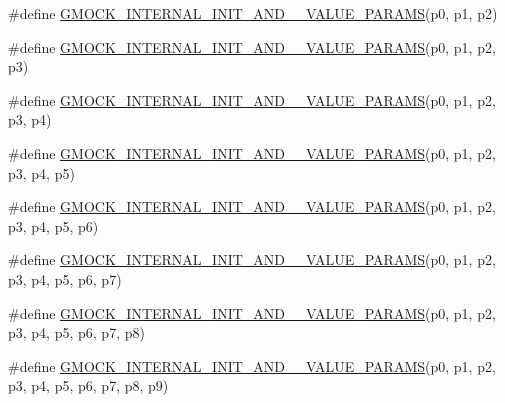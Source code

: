 \begin{DoxyCompactItemize}
\item 
\#define \mbox{\hyperlink{googletest-master_2googlemock_2include_2gmock_2gmock-generated-actions_8h_ab452cc97981b64f68df83aedc023a201}{G\+M\+O\+C\+K\+\_\+\+I\+N\+T\+E\+R\+N\+A\+L\+\_\+\+I\+N\+I\+T\+\_\+\+A\+N\+D\+\_\+\_\+\+V\+A\+L\+U\+E\+\_\+\+P\+A\+R\+A\+MS}}(p0,  p1,  p2)
\item 
\#define \mbox{\hyperlink{googletest-master_2googlemock_2include_2gmock_2gmock-generated-actions_8h_a9749c8366b3617ee3d14f4f4e9ae18ae}{G\+M\+O\+C\+K\+\_\+\+I\+N\+T\+E\+R\+N\+A\+L\+\_\+\+I\+N\+I\+T\+\_\+\+A\+N\+D\+\_\+\_\+\+V\+A\+L\+U\+E\+\_\+\+P\+A\+R\+A\+MS}}(p0,  p1,  p2,  p3)
\item 
\#define \mbox{\hyperlink{googletest-master_2googlemock_2include_2gmock_2gmock-generated-actions_8h_ab3c77cabbb94ae2e3a4f9fdbda784731}{G\+M\+O\+C\+K\+\_\+\+I\+N\+T\+E\+R\+N\+A\+L\+\_\+\+I\+N\+I\+T\+\_\+\+A\+N\+D\+\_\+\_\+\+V\+A\+L\+U\+E\+\_\+\+P\+A\+R\+A\+MS}}(p0,  p1,  p2,  p3,  p4)
\item 
\#define \mbox{\hyperlink{googletest-master_2googlemock_2include_2gmock_2gmock-generated-actions_8h_aef68add35463c75130872b22d07c43ff}{G\+M\+O\+C\+K\+\_\+\+I\+N\+T\+E\+R\+N\+A\+L\+\_\+\+I\+N\+I\+T\+\_\+\+A\+N\+D\+\_\+\_\+\+V\+A\+L\+U\+E\+\_\+\+P\+A\+R\+A\+MS}}(p0,  p1,  p2,  p3,  p4,  p5)
\item 
\#define \mbox{\hyperlink{googletest-master_2googlemock_2include_2gmock_2gmock-generated-actions_8h_aa1ba027eec9b36d5e710bfe9da99d443}{G\+M\+O\+C\+K\+\_\+\+I\+N\+T\+E\+R\+N\+A\+L\+\_\+\+I\+N\+I\+T\+\_\+\+A\+N\+D\+\_\+\_\+\+V\+A\+L\+U\+E\+\_\+\+P\+A\+R\+A\+MS}}(p0,  p1,  p2,  p3,  p4,  p5,  p6)
\item 
\#define \mbox{\hyperlink{googletest-master_2googlemock_2include_2gmock_2gmock-generated-actions_8h_a12a0e970438c008214093b98b8eefa68}{G\+M\+O\+C\+K\+\_\+\+I\+N\+T\+E\+R\+N\+A\+L\+\_\+\+I\+N\+I\+T\+\_\+\+A\+N\+D\+\_\+\_\+\+V\+A\+L\+U\+E\+\_\+\+P\+A\+R\+A\+MS}}(p0,  p1,  p2,  p3,  p4,  p5,  p6,  p7)
\item 
\#define \mbox{\hyperlink{googletest-master_2googlemock_2include_2gmock_2gmock-generated-actions_8h_aa69890581b384540649239847bd7dcbf}{G\+M\+O\+C\+K\+\_\+\+I\+N\+T\+E\+R\+N\+A\+L\+\_\+\+I\+N\+I\+T\+\_\+\+A\+N\+D\+\_\+\_\+\+V\+A\+L\+U\+E\+\_\+\+P\+A\+R\+A\+MS}}(p0,  p1,  p2,  p3,  p4,  p5,  p6,  p7,  p8)
\item 
\#define \mbox{\hyperlink{googletest-master_2googlemock_2include_2gmock_2gmock-generated-actions_8h_aeed917d405a99878e11d53b8eca2b744}{G\+M\+O\+C\+K\+\_\+\+I\+N\+T\+E\+R\+N\+A\+L\+\_\+\+I\+N\+I\+T\+\_\+\+A\+N\+D\+\_\+\_\+\+V\+A\+L\+U\+E\+\_\+\+P\+A\+R\+A\+MS}}(p0,  p1,  p2,  p3,  p4,  p5,  p6,  p7,  p8,  p9)

\end{DoxyCompactItemize}
